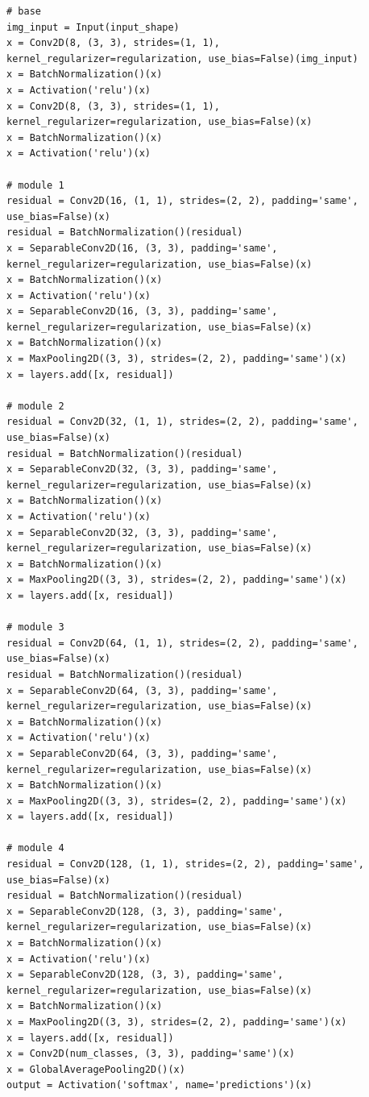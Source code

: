 \documentclass[runningheads,a4paper,11pt]{report}
\begin{document}
\begin{appendices}
\begin{lstlisting}
# base
img_input = Input(input_shape)
x = Conv2D(8, (3, 3), strides=(1, 1), kernel_regularizer=regularization, use_bias=False)(img_input)
x = BatchNormalization()(x)
x = Activation('relu')(x)
x = Conv2D(8, (3, 3), strides=(1, 1), kernel_regularizer=regularization, use_bias=False)(x)
x = BatchNormalization()(x)
x = Activation('relu')(x)

# module 1
residual = Conv2D(16, (1, 1), strides=(2, 2), padding='same', use_bias=False)(x)
residual = BatchNormalization()(residual)
x = SeparableConv2D(16, (3, 3), padding='same', kernel_regularizer=regularization, use_bias=False)(x)
x = BatchNormalization()(x)
x = Activation('relu')(x)
x = SeparableConv2D(16, (3, 3), padding='same', kernel_regularizer=regularization, use_bias=False)(x)
x = BatchNormalization()(x)
x = MaxPooling2D((3, 3), strides=(2, 2), padding='same')(x)
x = layers.add([x, residual])

# module 2
residual = Conv2D(32, (1, 1), strides=(2, 2), padding='same', use_bias=False)(x)
residual = BatchNormalization()(residual)
x = SeparableConv2D(32, (3, 3), padding='same', kernel_regularizer=regularization, use_bias=False)(x)
x = BatchNormalization()(x)
x = Activation('relu')(x)
x = SeparableConv2D(32, (3, 3), padding='same', kernel_regularizer=regularization, use_bias=False)(x)
x = BatchNormalization()(x)
x = MaxPooling2D((3, 3), strides=(2, 2), padding='same')(x)
x = layers.add([x, residual])

# module 3
residual = Conv2D(64, (1, 1), strides=(2, 2), padding='same', use_bias=False)(x)
residual = BatchNormalization()(residual)
x = SeparableConv2D(64, (3, 3), padding='same', kernel_regularizer=regularization, use_bias=False)(x)
x = BatchNormalization()(x)
x = Activation('relu')(x)
x = SeparableConv2D(64, (3, 3), padding='same', kernel_regularizer=regularization, use_bias=False)(x)
x = BatchNormalization()(x)
x = MaxPooling2D((3, 3), strides=(2, 2), padding='same')(x)
x = layers.add([x, residual])

# module 4
residual = Conv2D(128, (1, 1), strides=(2, 2), padding='same', use_bias=False)(x)
residual = BatchNormalization()(residual)
x = SeparableConv2D(128, (3, 3), padding='same', kernel_regularizer=regularization, use_bias=False)(x)
x = BatchNormalization()(x)
x = Activation('relu')(x)
x = SeparableConv2D(128, (3, 3), padding='same', kernel_regularizer=regularization, use_bias=False)(x)
x = BatchNormalization()(x)
x = MaxPooling2D((3, 3), strides=(2, 2), padding='same')(x)
x = layers.add([x, residual])
x = Conv2D(num_classes, (3, 3), padding='same')(x)
x = GlobalAveragePooling2D()(x)
output = Activation('softmax', name='predictions')(x)


\end{lstlisting}
\end{appendices}
\end{document}
